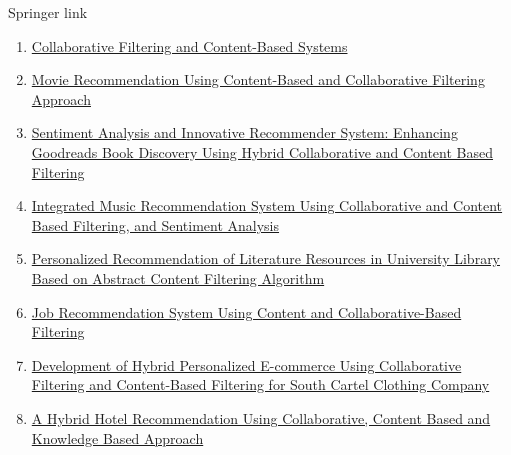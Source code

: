 Springer link
\begin{enumerate}[noitemsep, topsep=1px]
    \item \href{https://link.springer.com/chapter/10.1007/978-981-97-0538-2_3}{Collaborative Filtering and Content-Based Systems}
    \item \href{https://link.springer.com/chapter/10.1007/978-3-031-35078-8_37}{Movie Recommendation Using Content-Based and Collaborative Filtering Approach}
    \item \href{https://link.springer.com/chapter/10.1007/978-3-031-59707-7_9}{Sentiment Analysis and Innovative Recommender System: Enhancing Goodreads Book Discovery Using Hybrid Collaborative and Content Based Filtering}
    \item \href{https://link.springer.com/chapter/10.1007/978-3-031-34622-4_13}{Integrated Music Recommendation System Using Collaborative and Content Based Filtering, and Sentiment Analysis}
    \item \href{https://link.springer.com/chapter/10.1007/978-981-99-2287-1_50}{Personalized Recommendation of Literature Resources in University Library Based on Abstract Content Filtering Algorithm}
    \item \href{https://link.springer.com/chapter/10.1007/978-981-16-2594-7_47}{Job Recommendation System Using Content and Collaborative-Based Filtering} 
    \item \href{https://link.springer.com/chapter/10.1007/978-981-19-7660-5_8}{Development of Hybrid Personalized E-commerce Using Collaborative Filtering and Content-Based Filtering for South Cartel Clothing Company}
    \item \href{https://link.springer.com/chapter/10.1007/978-3-031-19958-5_98}{A Hybrid Hotel Recommendation Using Collaborative, Content Based and Knowledge Based Approach}
\end{enumerate}